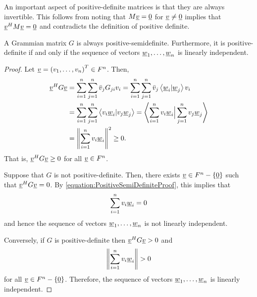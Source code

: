 An important aspect of positive-definite matrices is that they are always invertible.
This follows from noting that $M\underline{v} = \underline{0}$ for $\underline{v}\neq\underline{0}$ implies that $\underline{v}^H M \underline{v} = \underline{0}$ and contradicts the definition of positive definite.

\begin{theorem}
A Grammian matrix $G$ is always positive-semidefinite.
Furthermore, it is positive-definite if and only if the sequence of vectors $\underline{w}_1, \ldots, \underline{w}_n$ is linearly independent.
\end{theorem}
\begin{proof}
Let $\underline{v} = \left( v_1, \ldots, v_n \right)^T \in F^n$.
Then,
\begin{equation} \label{equation:PositiveSemiDefiniteProof}
\begin{split}
\underline{v}^H G \underline{v} &=
\sum_{i=1}^n \sum_{j=1}^n \bar{v}_j G_{ji} v_i
= \sum_{i=1}^n \sum_{j=1}^n \bar{v}_j \left\langle \underline{w}_i | \underline{w}_j \right\rangle v_i \\
&= \sum_{i=1}^n \sum_{j=1}^n \left\langle v_i \underline{w}_i | v_j \underline{w}_j \right\rangle
= \left\langle \sum_{i=1}^n v_i \underline{w}_i \Big| \sum_{j=1}^n v_j \underline{w}_j \right\rangle \\
&= \left\| \sum_{i=1}^n v_i \underline{w}_i \right\|^2
\geq 0.
\end{split}
\end{equation}
That is, $\underline{v}^H G \underline{v} \geq 0$ for all $\underline{v} \in F^n$.

Suppose that $G$ is not positive-definite.
Then, there exists $\underline{v} \in F^n - \left\{ \underline{0} \right\}$ such that $\underline{v}^H G \underline{v} = 0$.
By \eqref{equation:PositiveSemiDefiniteProof}, this implies that
\begin{equation*}
\sum_{i=1}^n v_i \underline{w}_i = 0
\end{equation*}
and hence the sequence of vectors $\underline{w}_1, \ldots, \underline{w}_n$ is not linearly independent.

Conversely, if $G$ is positive-definite then $\underline{v}^H G \underline{v} > 0$ and
\begin{equation*}
\left\| \sum_{i=1}^n v_i \underline{w}_i \right\| > 0
\end{equation*}
for all $\underline{v} \in F^n - \left\{ \underline{0} \right\}$.
Therefore, the sequence of vectors $\underline{w}_1, \ldots, \underline{w}_n$ is linearly independent.
\end{proof}



